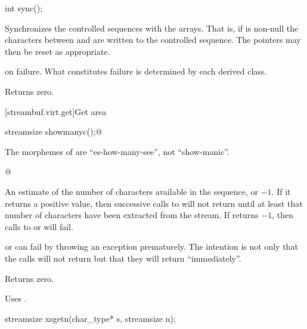%
\begin{itemdecl}
int sync();
\end{itemdecl}

\begin{itemdescr}
\pnum
\effects
Synchronizes the controlled sequences with the arrays.
That is, if
is non-null the characters between
and
are written to the controlled sequence.
The pointers may then be reset as appropriate.

\pnum
\returns
{} on failure.
What constitutes failure is determined by each derived class.

\pnum
{}
Returns zero.
\end{itemdescr}

[streambuf.virt.get]{Get area}

%
\begin{itemdecl}
streamsize showmanyc();@
\begin{footnote}
The morphemes of  are ``es-how-many-see'', not ``show-manic''.
\end{footnote}@
\end{itemdecl}

\begin{itemdescr}
\pnum
\returns
An estimate of the number of
characters available in the sequence, or $-1$.
If it returns
a positive value, then successive calls to
will not return
until at least that number of characters have been
extracted from the stream.
If
returns $-1$, then calls to
or
will fail.
\begin{footnote}
or
can fail by throwing an exception prematurely.
The intention is not only that the calls will not return
but that they will return ``immediately''.
\end{footnote}

\pnum
{}
Returns zero.

\pnum
\remarks
Uses
.
\end{itemdescr}

%
\begin{itemdecl}
streamsize xsgetn(char_type* s, streamsize n);
\end{itemdecl}

